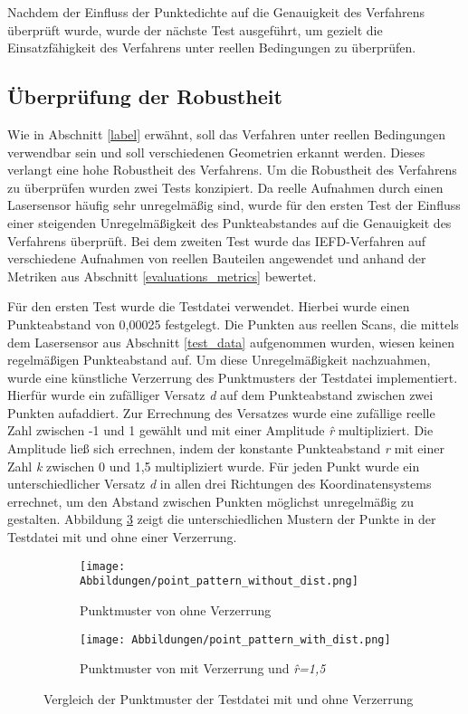 Nachdem der Einfluss der Punktedichte auf die Genauigkeit des Verfahrens überprüft wurde, wurde der nächste Test ausgeführt, um gezielt die Einsatzfähigkeit des Verfahrens unter reellen Bedingungen zu überprüfen.

\subsection{Überprüfung der Robustheit}
Wie in Abschnitt \ref{label} erwähnt, soll das Verfahren unter reellen Bedingungen verwendbar sein und soll verschiedenen Geometrien erkannt werden. Dieses verlangt eine hohe Robustheit des Verfahrens. Um die Robustheit des Verfahrens zu überprüfen wurden zwei Tests konzipiert. Da reelle Aufnahmen durch einen Lasersensor häufig sehr unregelmäßig sind, wurde für den ersten Test der Einfluss einer steigenden Unregelmäßigkeit des Punkteabstandes auf die Genauigkeit des Verfahrens überprüft. Bei dem zweiten Test wurde das IEFD-Verfahren auf verschiedene Aufnahmen von reellen Bauteilen angewendet und anhand der Metriken aus Abschnitt \ref{evaluations_metrics} bewertet.

Für den ersten Test wurde die Testdatei \testcloud verwendet. Hierbei wurde einen Punkteabstand von 0,00025 festgelegt. Die Punkten aus reellen Scans, die mittels dem Lasersensor aus Abschnitt \ref{test_data} aufgenommen wurden, wiesen keinen regelmäßigen Punkteabstand auf. Um diese Unregelmäßigkeit nachzuahmen, wurde eine künstliche Verzerrung des Punktmusters der Testdatei implementiert. Hierfür wurde ein zufälliger Versatz \textit{d} auf dem Punkteabstand zwischen zwei Punkten aufaddiert. Zur Errechnung des Versatzes wurde eine zufällige reelle Zahl zwischen -1 und 1 gewählt und mit einer Amplitude \textit{\^{r}} multipliziert. Die Amplitude ließ sich errechnen, indem der konstante Punkteabstand \textit{r} mit einer Zahl \textit{k} zwischen 0 und 1,5 multipliziert wurde. Für jeden Punkt wurde ein unterschiedlicher Versatz \textit{d} in allen drei Richtungen des Koordinatensystems errechnet, um den Abstand zwischen Punkten möglichst unregelmäßig zu gestalten. Abbildung \ref{fig: point_pattern_comparision} zeigt die unterschiedlichen Mustern der Punkte in der Testdatei mit und ohne einer Verzerrung. 

\begin{figure}[t]
	\centering
	\begin{subfigure}{0.75\textwidth}
		\texttt{[image: Abbildungen/point\_pattern\_without\_dist.png]}
		\centering
		\caption{Punktmuster von \testcloud ohne Verzerrung}
		\label{fig: point_pattern_without_dist}
	\end{subfigure}
	\hfill
	\begin{subfigure}{0.75\textwidth}
		\texttt{[image: Abbildungen/point\_pattern\_with\_dist.png]}
		\centering
		\caption{Punktmuster von \testcloud mit Verzerrung und \textit{\^{r}=1,5}}
		\label{fig: point_patter_with_dist}
	\end{subfigure}
	\caption{Vergleich der Punktmuster der Testdatei mit und ohne Verzerrung}
	\label{fig: point_pattern_comparision}
\end{figure}

